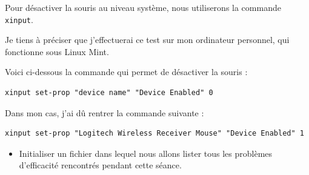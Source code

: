\documentclass[12pt]{article}
\begin{document}
\vspace{0.3cm}

Pour désactiver la souris au niveau système, nous utiliserons la commande \texttt{xinput}.

\vspace{0.3cm}

Je tiens à préciser que j'effectuerai ce test sur mon ordinateur personnel, qui fonctionne sous Linux Mint.

\vspace{0.3cm}

Voici ci-dessous la commande qui permet de désactiver la souris :

\begin{verbatim}
xinput set-prop "device name" "Device Enabled" 0
\end{verbatim}

Dans mon cas, j'ai dû rentrer la commande suivante :

\begin{verbatim}
xinput set-prop "Logitech Wireless Receiver Mouse" "Device Enabled" 1
\end{verbatim}

\vspace{0.3cm}

\begin{itemize}
  \item Initialiser un fichier dans lequel nous allons lister tous les problèmes d'efficacité rencontrés pendant cette séance.
\end{itemize}
\vspace{0.3cm}
\end{document}
